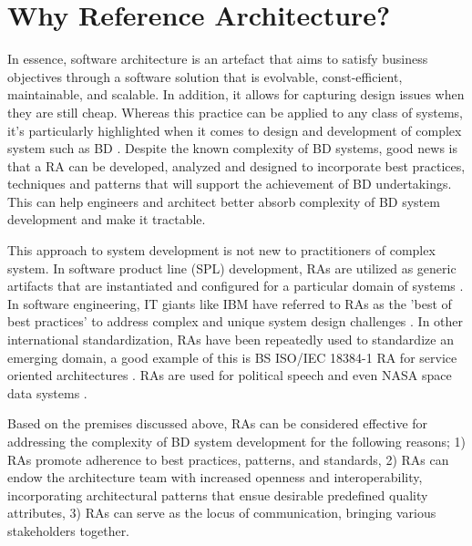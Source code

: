 \documentclass[runningheads]{llncs}
\begin{document}
\section{Why Reference Architecture?}

In essence, software architecture is an artefact that aims to satisfy business objectives through a software solution that is evolvable, const-efficient, maintainable, and scalable. In addition, it allows for capturing design issues when they are still cheap. Whereas this practice can be applied to any class of systems, it's particularly highlighted when it comes to design and development of complex system such as BD \cite{ataei2021neomycelia}. Despite the known complexity of BD systems, good news is that a RA can be developed, analyzed and designed to incorporate best practices, techniques and patterns that will support the achievement of BD undertakings. This can help engineers and architect better absorb complexity of BD system development and make it tractable. 

This approach to system development is not new to practitioners of complex system. In software product line (SPL) development, RAs are utilized as generic artifacts that are instantiated and configured for a particular domain of systems \cite{Derras}. In software engineering, IT giants like IBM have referred to RAs as the 'best of best practices' to address complex and unique system design challenges \cite{Cloutier}. In other international standardization, RAs have been repeatedly used to standardize an emerging domain, a good example of this is BS ISO/IEC 18384-1 RA for service oriented architectures \cite{Iso18384-1}. RAs are used for political speech and even NASA space data systems \cite{NASA}.

Based on the premises discussed above, RAs can be considered effective for addressing the complexity of BD system development for the following reasons; 1) RAs promote adherence to best practices, patterns, and standards, 2) RAs can endow the architecture team with increased openness and interoperability, incorporating architectural patterns that ensue desirable predefined quality attributes, 3) RAs can serve as the locus of communication, bringing various stakeholders together. 
\end{document}
